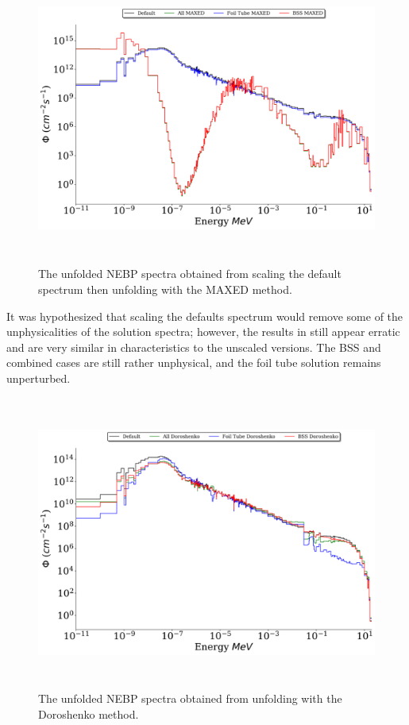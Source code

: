 \begin{figure}[htb]
\includegraphics[height=3.8in]{tex/figures/unfolded_mx_sc.png}
\caption[MAXED Unfolded Spectra (Scaled)]{The unfolded NEBP spectra obtained from scaling the default spectrum then unfolding with the MAXED method.}
\label{fig:unfolded_mx_sc}
\end{figure}

It was hypothesized that scaling the defaults spectrum would remove some of the unphysicalities of the solution spectra; however, the results in  still appear erratic and are very similar in characteristics to the unscaled versions.
The BSS and combined cases are still rather unphysical, and the foil tube solution remains unperturbed.

\begin{figure}[htb]
\includegraphics[height=3.8in]{tex/figures/unfolded_do.png}
\caption[Doroshenko Unfolded Spectra]{The unfolded NEBP spectra obtained from unfolding with the Doroshenko method.}
\label{fig:unfolded_do}
\end{figure}

